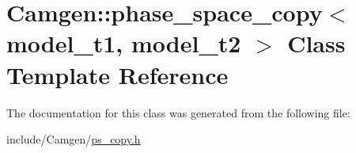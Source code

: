 \hypertarget{a00418}{}\section{Camgen\+:\+:phase\+\_\+space\+\_\+copy$<$ model\+\_\+t1, model\+\_\+t2 $>$ Class Template Reference}
\label{a00418}


The documentation for this class was generated from the following file\+:\begin{DoxyCompactItemize}
\item 
include/\+Camgen/\hyperlink{a00740}{ps\+\_\+copy.\+h}\end{DoxyCompactItemize}
